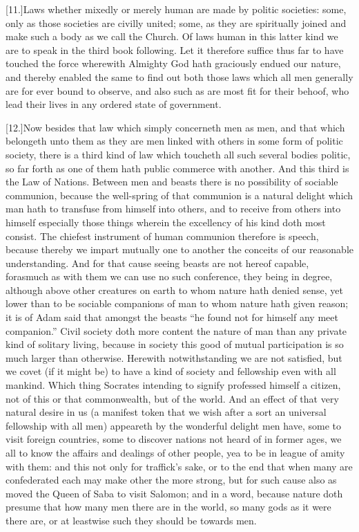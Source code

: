 [11.]Laws whether mixedly or merely human are made by politic societies: some, only as those societies are civilly united; some, as they are spiritually joined and make such a body as we call the Church. Of laws human in this latter kind we are to speak in the third book following. Let it therefore suffice thus far to have touched the force wherewith Almighty God hath graciously endued our nature, and thereby enabled the same to find out both those laws which all men generally are for ever bound to observe, and also such  as are most fit for their behoof, who lead their lives in any ordered state of government.

[12.]Now besides that law which simply concerneth men as men, and that which belongeth unto them as they are men linked with others in some form of politic society, there is a third kind of law which toucheth all such several bodies politic, so far forth as one of them hath public commerce with another. And this third is the Law of Nations. Between men and beasts there is no possibility of sociable communion, because the well-spring of that communion is a natural delight which man hath to transfuse from himself into others, and to receive from others into himself especially those things wherein the excellency of his kind doth most consist. The chiefest instrument of human communion therefore is speech, because thereby we impart mutually one to another the conceits of our reasonable understanding. And for that cause seeing beasts are not hereof capable, forasmuch as with them we can use no such conference, they being in degree, although above other creatures on earth to whom nature hath denied sense, yet lower than to be sociable companions of man to whom nature hath given reason; it is of Adam said that amongst the beasts “he found not for himself any meet companion.” Civil society doth more content the nature of man than any private kind of solitary living, because in society this good of mutual participation is so much larger than otherwise. Herewith notwithstanding we are not satisfied, but we covet (if it might be) to have a kind of society and fellowship even with all mankind. Which thing Socrates intending to signify professed himself a citizen, not of this or that commonwealth, but of the world. And an effect of that very natural desire in us (a manifest token that we wish after a sort an universal fellowship with all men) appeareth by the wonderful delight men have, some to visit foreign countries, some to discover nations not heard of in former ages, we all to know the affairs and dealings of other people, yea to be in league of amity with them: and this not only for traffick’s sake, or to the end that when many are confederated each may make other the more strong, but  for such cause also as moved the Queen of Saba to visit Salomon; and in a word, because nature doth presume that how many men there are in the world, so many gods as it were there are, or at leastwise such they should be towards men.

